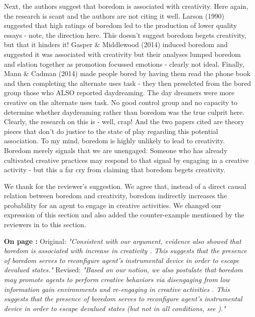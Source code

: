 \documentclass[utf8]{article}
\newenvironment{reply}  
    {\color{Blue}\noindent\newline}
    {\newline}
\newcommand{\revise}[3]{
    \noindent
    \newline
    \textbf{On page {#1}:}\newline
    \newline
    Original:\newline
    \textit{"#2"}
    \newline
    \newline
    Revised:\newline
    \textit{"#3"}\newline}
\begin{document}
        Next, the authors suggest that boredom is associated with creativity. Here again, the research is scant and the authors are not citing it well. Larson (1990) suggested that high ratings of boredom led to the production of lower quality essays - note, the direction here. This doesn't suggest boredom begets creativity, but that it hinders it! Gasper \& Middlewood (2014) induced boredom and suggested it was associated with creativity but their analyses lumped boredom and elation together as promotion focussed emotions - clearly not ideal. Finally, Mann \& Cadman (2014) made people bored by having them read the phone book and then completing the alternate uses task - they then preselcted from the bored group those who ALSO reported daydreaming. The day dreamers were more creative on the alternate uses task. No good control group and no capacity to determine whether daydreaming rather than boredom was the true culprit here. Clearly, the research on this is - well, crap! And the two papers cited are theory pieces that don't do justice to the state of play regarding this potential association. To my mind, boredom is highly unlikely to lead to creativity. Boredom merely signals that we are unengaged. Someone who has already cultivated creative practices may respond to that signal by engaging in a creative activity - but this a far cry from claiming that boredom begets creativity.
        
        
         
        \begin{reply}
            We thank for the reviewer's suggestion. We agree that, instead of a direct causal relation between boredom and creativity, boredom indirectly increases the probability for an agent to engage in creative activities. We changed our expression of this section and also added the counter-example \citep{larson1990emotions} mentioned by the reviewers in to this section.
            
            \revise{\pageref{rev:creativity}}
                {Consistent with our argument, evidence also showed that boredom is associated with increase in creativity \citep{harris2000correlates, schubert1977boredom, schubert1978creativity}. This suggests that the presence of boredom serves to reconfigure agent's instrumental device in order to escape devalued states.}
                {Based on our notion, we also postulate that boredom may promote agents to perform creative behaviors via disengaging from low information gain environments and re-engaging in creative activities \citep{harris2000correlates, schubert1977boredom, schubert1978creativity}. This suggests that the presence of boredom serves to reconfigure agent's instrumental device in order to escape devalued states (but not in all conditions, see \cite{larson1990emotions}).}
        

        \end{reply}
        
\end{document}

